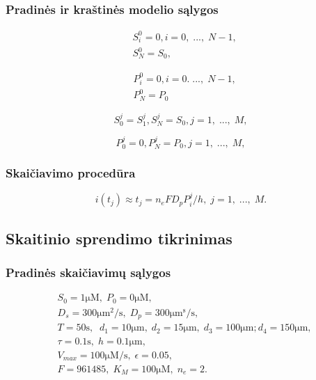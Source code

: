 \documentclass[12pt, a4paper, lithuanian]{article}
\begin{document}
\subsubsection{Pradinės ir kraštinės modelio sąlygos}
\begin{equation}
\begin{aligned}
    &S_i^0 = 0, i = 0,\;...,\;N-1,\\
    &S_N^0 = S_0,
\end{aligned}
\end{equation}

\begin{equation}
\begin{aligned}
    &P_i^0 = 0, i = 0.\;...,\;N-1,\\
    &P_N^0 = P_0
\end{aligned}
\end{equation}

\begin{equation} 
    S_0^j = S_1^j, S_N^j = S_0, j=1,\; ...,\;M, 
\end{equation}

\begin{equation} 
    P_0^j = 0, P_N^j = P_0, j=1,\; ...,\;M, 
\end{equation}

\subsubsection{Skaičiavimo procedūra}

\begin{equation} 
    i(t_j) \approx t_j = n_eFD_pP_i^j/h,\; j=1,\;...,\;M. 
\end{equation}

\subsection{Skaitinio sprendimo tikrinimas}
\subsubsection{Pradinės skaičiavimų sąlygos}

\begin{equation}
\begin{aligned}
    &S_0 = 1 \mathrm{\mu M},\; P_0 = 0 \mathrm{\mu M},\\
    &D_s = 300 \mathrm{\mu m^2/s},\; D_p = 300 \mathrm{\mu m^s/s},\\
    &T = 50\mathrm{s},\;\; d_1 = 10 \mathrm{\mu m},\; d_2 = 15\mathrm{\mu m},\; d_3 = 100\mathrm{\mu m}; d_4 =
    150\mathrm{\mu m},\\
    &\tau = 0.1\mathrm{s},\; h=0.1 \mathrm{\mu m},\\
    &V_{max} = 100\mathrm{\mu M /s},\; \epsilon = 0.05,\\
    &F=961485,\; K_M= 100\mathrm{\mu M},\; n_e = 2.
\end{aligned}
\end{equation}
\end{document}
